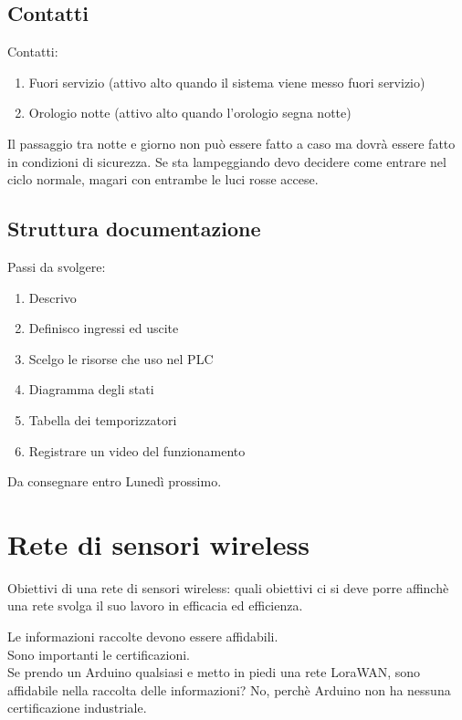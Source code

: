 \documentclass{article}
\begin{document}
    \vspace{1cm}

    \subsection{Contatti}
    Contatti:
    \begin{enumerate}
        \item Fuori servizio (attivo alto quando il sistema viene messo fuori servizio)
        \item Orologio notte (attivo alto quando l'orologio segna notte)
    \end{enumerate}

    Il passaggio tra notte e giorno non può essere fatto a caso ma dovrà essere fatto in condizioni di sicurezza. Se sta lampeggiando devo decidere come entrare nel ciclo normale, magari con entrambe le luci rosse accese.

    \vspace{1cm}

    \subsection{Struttura documentazione}
    Passi da svolgere:
    \begin{enumerate}
        \item Descrivo
        \item Definisco ingressi ed uscite
        \item Scelgo le risorse che uso nel PLC
        \item Diagramma degli stati
        \item Tabella dei temporizzatori
        \item Registrare un video del funzionamento
    \end{enumerate}

    Da consegnare entro Lunedì prossimo.

    \section{Rete di sensori wireless}
    Obiettivi di una rete di sensori wireless: quali obiettivi ci si deve porre affinchè una rete svolga il suo lavoro in efficacia ed efficienza.

    Le informazioni raccolte devono essere affidabili.\\
    Sono importanti le certificazioni.\\
    Se prendo un Arduino qualsiasi e metto in piedi una rete LoraWAN, sono affidabile nella raccolta delle informazioni? No, perchè Arduino non ha nessuna certificazione industriale.
\end{document}
